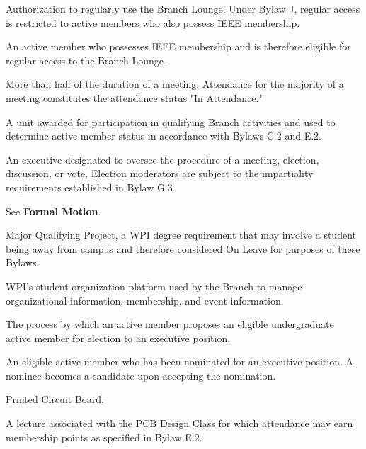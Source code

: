 \documentclass[11pt,a4paper]{article}
\begin{document}
\begin{description}[style=nextline, leftmargin=1.5em]
    \item[Lounge Access]
    Authorization to regularly use the Branch Lounge. Under Bylaw J, regular access is restricted to active members who also possess IEEE membership.

    \item[Lounge Member]
    An active member who possesses IEEE membership and is therefore eligible for regular access to the Branch Lounge.

    \item[Majority of a Meeting]
    More than half of the duration of a meeting. Attendance for the majority of a meeting constitutes the attendance status "In Attendance."

    \item[Membership Point]
    A unit awarded for participation in qualifying Branch activities and used to determine active member status in accordance with Bylaws C.2 and E.2.

    \item[Moderator]
    An executive designated to oversee the procedure of a meeting, election, discussion, or vote. Election moderators are subject to the impartiality requirements established in Bylaw G.3.

    \item[Motion]
    See \textbf{Formal Motion}.

    \item[MQP]
    Major Qualifying Project, a WPI degree requirement that may involve a student being away from campus and therefore considered On Leave for purposes of these Bylaws.
    
    \item[myWPI]
    WPI's student organization platform used by the Branch to manage organizational information, membership, and event information.

    \item[Nomination]
    The process by which an active member proposes an eligible undergraduate active member for election to an executive position.

    \item[Nominee]
    An eligible active member who has been nominated for an executive position. A nominee becomes a candidate upon accepting the nomination.

    \item[PCB]
    Printed Circuit Board.

    \item[PCB Design Lecture]
    A lecture associated with the PCB Design Class for which attendance may earn membership points as specified in Bylaw E.2.


\end{description}
\end{document}
